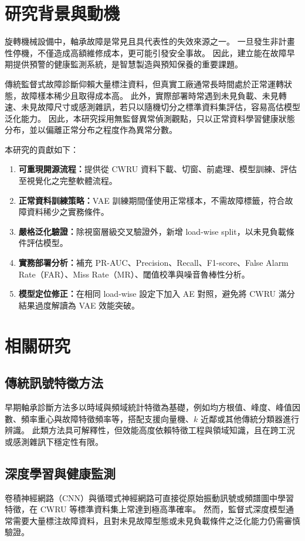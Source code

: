\documentclass[conference,compsoc]{IEEEtran}
\begin{document}
\IEEEpeerreviewmaketitle

\section{研究背景與動機}
旋轉機械設備中，軸承故障是常見且具代表性的失效來源之一。
一旦發生非計畫性停機，不僅造成高額維修成本，更可能引發安全事故。
因此，建立能在故障早期提供預警的健康監測系統，是智慧製造與預知保養的重要課題。

傳統監督式故障診斷仰賴大量標注資料，但真實工廠通常長時間處於正常運轉狀態，故障樣本稀少且取得成本高。
此外，實際部署時常遇到未見負載、未見轉速、未見故障尺寸或感測雜訊，若只以隨機切分之標準資料集評估，容易高估模型泛化能力。
因此，本研究採用無監督異常偵測觀點，只以正常資料學習健康狀態分布，並以偏離正常分布之程度作為異常分數。

本研究的貢獻如下：
\begin{enumerate}
  \item \textbf{可重現開源流程：}提供從 CWRU 資料下載、切窗、前處理、模型訓練、評估至視覺化之完整軟體流程。
  \item \textbf{正常資料訓練策略：}VAE 訓練期間僅使用正常樣本，不需故障標籤，符合故障資料稀少之實務條件。
  \item \textbf{嚴格泛化驗證：}除視窗層級交叉驗證外，新增 load-wise split，以未見負載條件評估模型。
  \item \textbf{實務部署分析：}補充 PR-AUC、Precision、Recall、F1-score、False Alarm Rate（FAR）、Miss Rate（MR）、閾值校準與噪音魯棒性分析。
  \item \textbf{模型定位修正：}在相同 load-wise 設定下加入 AE 對照，避免將 CWRU 滿分結果過度解讀為 VAE 效能突破。
\end{enumerate}

\section{相關研究}
\subsection{傳統訊號特徵方法}
早期軸承診斷方法多以時域與頻域統計特徵為基礎，例如均方根值、峰度、峰值因數、頻率重心與故障特徵頻率等，搭配支援向量機、$k$ 近鄰或其他傳統分類器進行辨識\cite{smith2015rolling}。
此類方法具可解釋性，但效能高度依賴特徵工程與領域知識，且在跨工況或感測雜訊下穩定性有限。

\subsection{深度學習與健康監測}
卷積神經網路（CNN）與循環式神經網路可直接從原始振動訊號或頻譜圖中學習特徵，在 CWRU 等標準資料集上常達到極高準確率\cite{zhao2019deep}。
然而，監督式深度模型通常需要大量標注故障資料，且對未見故障型態或未見負載條件之泛化能力仍需審慎驗證。
\end{document}
